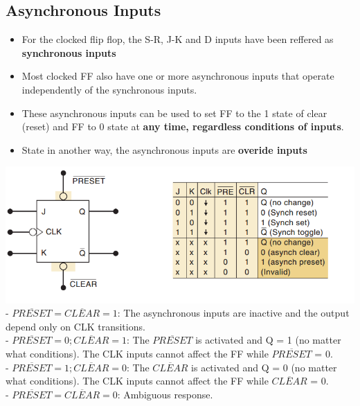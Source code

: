 \documentclass[12pt]{article}
\begin{document}
\subsection{Asynchronous Inputs}
\begin{itemize}
	\item For the clocked flip flop, the S-R, J-K and D inputs have been reffered as \textbf{synchronous inputs} 
	\item Most clocked FF also have one or more asynchronous inputs that operate independently of the synchronous inputs. 
	\item These asynchronous inputs can be used to set FF to the 1 state of clear (reset) and FF to 0 state at \textbf{any time, regardless conditions of inputs}.
	\item State in another way, the asynchronous inputs are \textbf{overide inputs}
\end{itemize}
\includegraphics[scale = 0.85]{hinh15.png}
\bigbreak
- $\overline{PRESET} = \overline{CLEAR} = 1$: The asynchronous inputs are inactive and the output depend only on CLK transitions. \\
- $\overline{PRESET} = 0; \overline{CLEAR} = 1$: The $\overline{PRESET}$ is activated and Q = 1 (no matter what conditions). The CLK inputs cannot affect the FF while $\overline{PRESET}$ = 0. \\
- $\overline{PRESET} = 1; \overline{CLEAR} = 0$: The $\overline{CLEAR}$ is activated and Q = 0 (no matter what conditions). The CLK inputs cannot affect the FF while $\overline{CLEAR}$ = 0. \\
- $\overline{PRESET} = \overline{CLEAR} = 0$: Ambiguous response. \\
\end{document}
